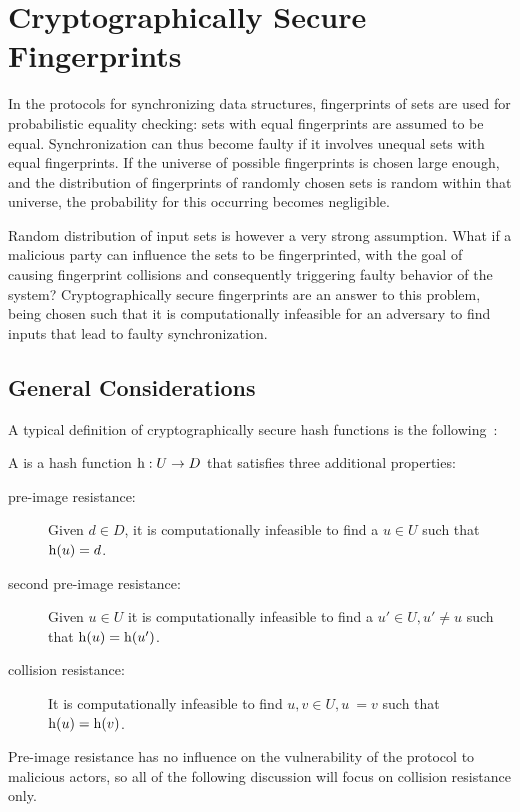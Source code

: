 \section{Cryptographically Secure Fingerprints}
\label{crypto}

In the protocols for synchronizing data structures, fingerprints of sets are used for probabilistic equality checking: sets with equal fingerprints are assumed to be equal. Synchronization can thus become faulty if it involves unequal sets with equal fingerprints. If the universe of possible fingerprints is chosen large enough, and the distribution of fingerprints of randomly chosen sets is random within that universe, the probability for this occurring becomes negligible.

Random distribution of input sets is however a very strong assumption. What if a malicious party can influence the sets to be fingerprinted, with the goal of causing fingerprint collisions and consequently triggering faulty behavior of the system? Cryptographically secure fingerprints are an answer to this problem, being chosen such that it is computationally infeasible for an adversary to find inputs that lead to faulty synchronization.

\subsection{General Considerations}

A typical definition of cryptographically secure hash functions is the following~\cite{menezes2018handbook}:

\begin{definition}
A  is a hash function ${\operatorname{h}}: {U} \rightarrow {D}$ that satisfies three additional properties:

\begin{description}
  \item[pre-image resistance:] Given $d \in D$, it is computationally infeasible to find a $u \in U$ such that $\operatorname{h}(u) = d$.
  \item[second pre-image resistance:] Given $u \in U$ it is computationally infeasible to find a $u' \in U, u' \neq u$ such that $\operatorname{h}(u) = \operatorname{h}(u')$.
  \item[collision resistance:] It is computationally infeasible to find $u, v \in U, u ~= v$ such that $\operatorname{h}(u) = \operatorname{h}(v)$.
\end{description}
\end{definition}

Pre-image resistance has no influence on the vulnerability of the protocol to malicious actors, so all of the following discussion will focus on collision resistance only.

